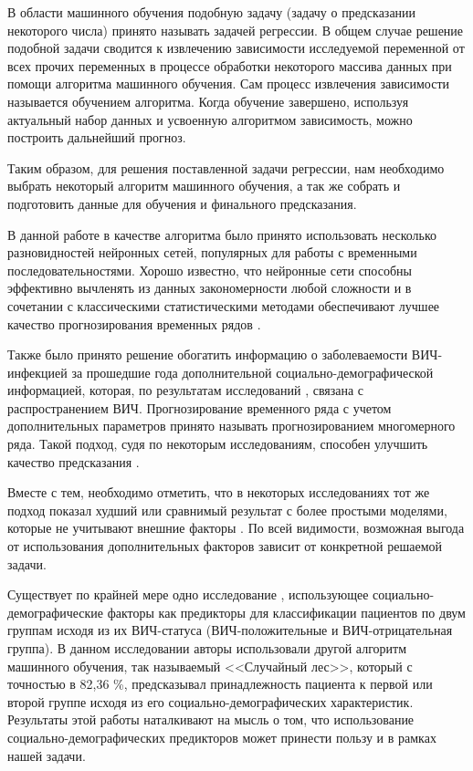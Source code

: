     В области машинного обучения подобную задачу (задачу о предсказании некоторого числа) принято называть задачей регрессии. В общем случае решение подобной задачи сводится к извлечению зависимости исследуемой переменной от всех прочих переменных в процессе обработки некоторого массива данных при помощи алгоритма машинного обучения. Сам процесс извлечения зависимости называется обучением алгоритма.
    Когда обучение завершено, используя актуальный набор данных и усвоенную алгоритмом зависимость, можно построить дальнейший прогноз.

    Таким образом, для решения поставленной задачи регрессии, нам необходимо выбрать некоторый алгоритм машинного обучения, а так же собрать и подготовить данные для обучения и финального предсказания.

    В данной работе в качестве алгоритма было принято использовать несколько разновидностей нейронных сетей, популярных для работы с временными последовательностями. Хорошо известно, что нейронные сети способны эффективно вычленять из данных закономерности любой сложности и в сочетании с классическими статистическими методами обеспечивают лучшее качество прогнозирования временных рядов \cite{M4, Multivariate_ES_LSTM_best}.

    Также было принято решение обогатить информацию о заболеваемости ВИЧ-инфекцией за прошедшие года дополнительной социально-демографической информацией, которая, по результатам исследований \cite{UrFu_socio_factors, Zanakis_Ortiz_socio_factors}, связана с распространением ВИЧ. Прогнозирование временного ряда с учетом дополнительных параметров принято называть прогнозированием многомерного ряда. Такой подход, судя по некоторым исследованиям, способен улучшить качество предсказания \cite{Multivariate_over_Univariate, VARMA_better_then_univariate}. 
    
    Вместе с тем, необходимо отметить, что в некоторых исследованиях тот же подход показал худший или сравнимый результат с более простыми моделями, которые не учитывают внешние факторы \cite{Univariate_better, Univariate_better_2}. По всей видимости, возможная выгода от использования дополнительных факторов зависит от конкретной решаемой задачи. 
    
    Существует по крайней мере одно исследование \cite{RFOREST_HIV_predict}, использующее социально-демографические факторы как предикторы для классификации пациентов по двум группам исходя из их ВИЧ-статуса (ВИЧ-положительные и ВИЧ-отрицательная группа). В данном исследовании авторы использовали другой алгоритм машинного обучения, так называемый <<Случайный лес>>, который с точностью в 82,36 \%, предсказывал принадлежность пациента к первой или второй группе исходя из его социально-демографических характеристик. Результаты этой работы наталкивают на мысль о том, что использование социально-демографических предикторов может принести пользу и в рамках нашей задачи. 

